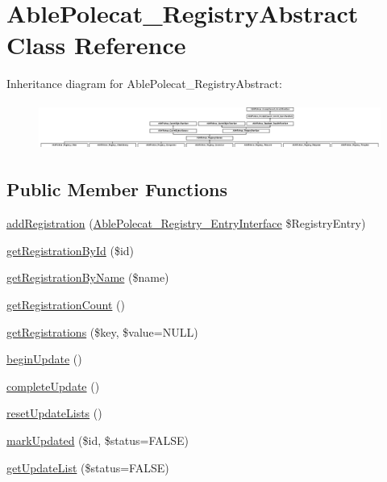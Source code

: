 \hypertarget{class_able_polecat___registry_abstract}{}\section{Able\+Polecat\+\_\+\+Registry\+Abstract Class Reference}
\label{class_able_polecat___registry_abstract}
Inheritance diagram for Able\+Polecat\+\_\+\+Registry\+Abstract\+:\begin{figure}[H]
\begin{center}
\leavevmode
\includegraphics[height=1.548387cm]{class_able_polecat___registry_abstract}
\end{center}
\end{figure}
\subsection*{Public Member Functions}
\begin{DoxyCompactItemize}
\item 
\hyperlink{class_able_polecat___registry_abstract_a22d8ddb551ccf544f1d2615db68ca9b1}{add\+Registration} (\hyperlink{interface_able_polecat___registry___entry_interface}{Able\+Polecat\+\_\+\+Registry\+\_\+\+Entry\+Interface} \$Registry\+Entry)
\item 
\hyperlink{class_able_polecat___registry_abstract_a06a999816a4143bb407c09628018a874}{get\+Registration\+By\+Id} (\$id)
\item 
\hyperlink{class_able_polecat___registry_abstract_a11594a43c95ab62b4841717c17cf0e54}{get\+Registration\+By\+Name} (\$name)
\item 
\hyperlink{class_able_polecat___registry_abstract_a4f5b90c7731c81b66bf67d79dad5dfc7}{get\+Registration\+Count} ()
\item 
\hyperlink{class_able_polecat___registry_abstract_a6f24c4ddef3e1c5dde4933e817fc5b4b}{get\+Registrations} (\$key, \$value=N\+U\+L\+L)
\item 
\hyperlink{class_able_polecat___registry_abstract_aa8c0a38f257c8ebb59f24f38bdb12419}{begin\+Update} ()
\item 
\hyperlink{class_able_polecat___registry_abstract_a363ee22699ad46520333ef24f64798bb}{complete\+Update} ()
\item 
\hyperlink{class_able_polecat___registry_abstract_ac91aa5a1d02834beeb440a94d33c6072}{reset\+Update\+Lists} ()
\item 
\hyperlink{class_able_polecat___registry_abstract_ab2683892f307a0f42eb0d869edfe5349}{mark\+Updated} (\$id, \$status=F\+A\+L\+S\+E)
\item 
\hyperlink{class_able_polecat___registry_abstract_aae89a4ca38c78f2001b1b80de35b8f50}{get\+Update\+List} (\$status=F\+A\+L\+S\+E)
\end{DoxyCompactItemize}
